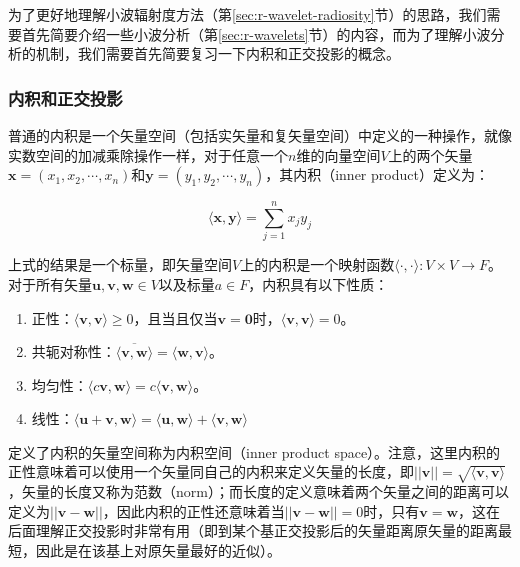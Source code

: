 为了更好地理解小波辐射度方法（第\ref{sec:r-wavelet-radiosity}节）的思路，我们需要首先简要介绍一些小波分析（第\ref{sec:r-wavelets}节）的内容，而为了理解小波分析的机制，我们需要首先简要复习一下内积和正交投影的概念。




\subsubsection{内积和正交投影}\label{sec:r-inner-product-and-projections}
普通的内积是一个矢量空间（包括实矢量和复矢量空间）中定义的一种操作，就像实数空间的加减乘除操作一样，对于任意一个$n$维的向量空间$V$上的两个矢量$\mathbf{x}=(x_1,x_2,\cdots,x_n)$和$\mathbf{y}=(y_1,y_2,\cdots,y_n)$，其内积（inner product）定义为：

\begin{equation}\label{e:r-inner-product}
	\langle \mathbf{x},\mathbf{y}\rangle =\sum^{n}_{j=1}x_jy_j
\end{equation}

\noindent 上式的结果是一个标量，即矢量空间$V$上的内积是一个映射函数$\langle\cdot,\cdot\rangle:V\times V\to F$。对于所有矢量$\mathbf{u},\mathbf{v},\mathbf{w}\in V$以及标量$a\in F$，内积具有以下性质：

\begin{enumerate}
	\item 正性：$\langle \mathbf{v},\mathbf{v}\rangle\geq 0$，且当且仅当$\mathbf{v}=\mathbf{0}$时，$\langle \mathbf{v},\mathbf{v}\rangle= 0$。
	\item 共轭对称性：$\overline{\langle \mathbf{v},\mathbf{w}\rangle}=\langle \mathbf{w},\mathbf{v}\rangle$。
	\item 均匀性：$\langle c\mathbf{v},\mathbf{w}\rangle=c\langle \mathbf{v},\mathbf{w}\rangle$。
	\item 线性：$\langle \mathbf{u}+\mathbf{v},\mathbf{w}\rangle=\langle \mathbf{u},\mathbf{w}\rangle+\langle \mathbf{v},\mathbf{w}\rangle$
\end{enumerate}

定义了内积的矢量空间称为内积空间（inner product space）。注意，这里内积的正性意味着可以使用一个矢量同自己的内积来定义矢量的长度，即$||\mathbf{v}||=\sqrt{\langle \mathbf{v},\mathbf{v}\rangle}$，矢量的长度又称为范数（norm）；而长度的定义意味着两个矢量之间的距离可以定义为$||\mathbf{v}-\mathbf{w}||$，因此内积的正性还意味着当$||\mathbf{v}-\mathbf{w}||=0$时，只有$\mathbf{v}=\mathbf{w}$，这在后面理解正交投影时非常有用（即到某个基正交投影后的矢量距离原矢量的距离最短，因此是在该基上对原矢量最好的近似）。


